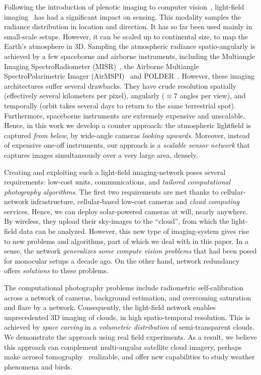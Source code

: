 \documentclass[runningheads]{llncs}
\begin{document}
Following the introduction of plenotic imaging to computer vision~\cite{Adelson1992}, light-field imaging~\cite{Basha2012,bishop,horstmeyer,Ng1948,kim} has had a significant impact on sensing. This modality samples the radiance distribution in location and direction. It has so far been used mainly in small-scale setups. However, it can be scaled up to continental size, to map the Earth's atmosphere in 3D. Sampling the atmospheric radiance spatio-angularly is achieved by a few spaceborne and airborne instruments, including the Multiangle Imaging SpectroRadiometer (MISR)~\cite{diner,Diner1998}, the Airborne Multiangle SpectroPolarimetric Imager (AirMSPI)~\cite{dinerDavis07,dinerDavis10} and POLDER~\cite{baxter,breon,vanMol}.
However, these imaging architectures suffer several drawbacks. They have crude resolution spatially (effectively several kilometers per pixel), angularly  ($\approx 7$ angles per view), and temporally (orbit takes several days to return to the same terrestrial spot). Furthermore, spaceborne instruments are extremely expensive and unscalable. Hence, in this work we develop a counter approach: the atmospheric lightfield is captured {\em from below}, by wide-angle cameras {\em looking upwards}. Moreover, instead of expensive one-off instruments, our approach is a {\em scalable sensor network} that captures images simultaneously over a very large area, densely.

Creating and exploiting such a light-field imaging-network poses several requirements: low-cost units,
communications, and {\em tailored computational photography algorithms}. The first two requirements are met  thanks to cellular-network infrastructure, cellular-based low-cost cameras and {\em cloud computing} services. Hence, we can deploy solar-powered cameras at will, nearly anywhere. By wireless, they upload their sky-images to the ``cloud'', from which the light-field data can be analyzed. However, this new type of imaging-system gives rise to new problems and algorithms, part of which we deal with in this paper. In a sense, the network {\em generalizes some compute vision problems} that had been posed for monocular setups a decade ago. On the other hand, network redundancy offers {\em solutions} to these problems.

The computational photography problems include radiometric self-calibration across a network of cameras, background estimation, and overcoming saturation and flare by a network. Consequently, the light-field network enables unprecedented 3D imaging of clouds, in high spatio-temporal resolution. This is achieved by {\em space carving} in a {\em volumetric distribution} of semi-transparent clouds. We demonstrate the approach using real field experiments. As a result, we believe this approach can complement multi-angular satellite cloud imagery, perhaps make aerosol tomography~\cite{Aides:13} realizable, and offer new capabilities to study weather phenomena and birds.
\end{document}

